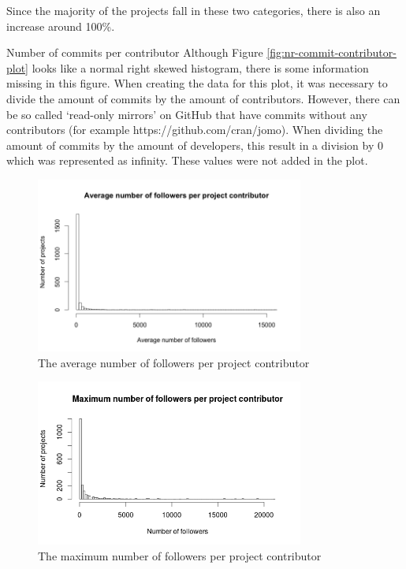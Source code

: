 \begin{LaTeXdescription}
    	Since the majority of the projects fall in these two categories, there is also an increase around 100\%.
    	\item[Number of commits per contributor]
    	Although Figure \ref{fig:nr-commit-contributor-plot} looks like a normal right skewed histogram, there is some information missing in this figure.
    	When creating the data for this plot, it was necessary to divide the amount of commits by the amount of contributors.
    	However, there can be so called `read-only mirrors' on GitHub that have commits without any contributors (for example https://github.com/cran/jomo).
    	When dividing the amount of commits by the amount of developers, this result in a division by 0 which was represented as infinity.
    	These values were not added in the plot. 
    	\end{LaTeXdescription}
        
	    \begin{figure}[t!]
	        \includegraphics[width=250pt]{figures/average-number-of-followers-per-project-contributor}
	        \caption{The average number of followers per project contributor}
	        \label{fig:avg-follower-contributor-plot}
	    \end{figure}

	    \begin{figure}[t!]
	        \includegraphics[width=250pt]{figures/maximum-number-of-followers-per-project-contributor}
	        \caption{The maximum number of followers per project contributor}
	        \label{fig:max-follower-contributor-plot}
	    \end{figure}


